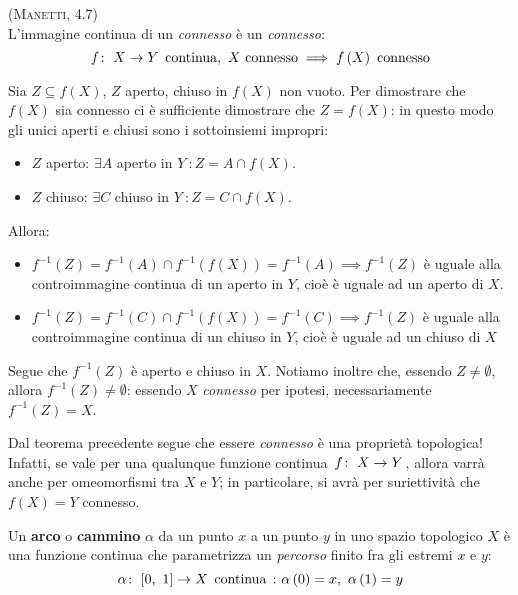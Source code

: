 \begin{theorema}\textsc{(Manetti, 4.7)}\\
	L'immagine continua di un \textit{connesso} è un \textit{connesso}:
	\begin{equation}
		\funz{f}{X}{Y}\text{ continua},\ X\text{ connesso}\implies f\left(X\right)\text{ connesso}
	\end{equation}
\end{theorema}
\begin{theorema}
	Sia $Z\subseteq f\left(X\right)$, $Z$ aperto, chiuso in $f\left(X\right)$ non vuoto. Per dimostrare che $f\left(X\right)$ sia connesso ci è sufficiente dimostrare che $Z=f\left(X\right)$: in questo modo gli unici aperti e chiusi sono i sottoinsiemi impropri:
	\begin{itemize}
		\item $Z$ aperto: $\exists A$ aperto in $Y\ \colon Z=A\cap f\left(X\right)$.
		\item $Z$ chiuso: $\exists C$ chiuso in $Y\ \colon Z=C\cap f\left(X\right)$.
	\end{itemize}
Allora:
	\begin{itemize}
	\item $f^{-1}\left(Z\right)=f^{-1}\left(A\right)\cap f^{-1}\left(f\left(X\right)\right)=f^{-1}\left(A\right)\implies f^{-1}\left(Z\right)$ è uguale alla controimmagine continua di un aperto in $Y$, cioè è uguale ad un aperto di $X$.
	\item $f^{-1}\left(Z\right)=f^{-1}\left(C\right)\cap f^{-1}\left(f\left(X\right)\right)=f^{-1}\left(C\right)\implies f^{-1}\left(Z\right)$ è uguale alla controimmagine continua di un chiuso in $Y$, cioè è uguale ad un chiuso di $X$
	\end{itemize}
Segue che $f^{-1}\left(Z\right)$ è aperto e chiuso in $X$. Notiamo inoltre che, essendo $Z\neq \emptyset$, allora $f^{-1}\left(Z\right)\neq \emptyset$: essendo $X$ \textit{connesso} per ipotesi, necessariamente $f^{-1}\left(Z\right)=X$.
\end{theorema}
\begin{observe}
Dal teorema precedente segue che essere \textit{connesso} è una proprietà topologica! Infatti, se vale per una qualunque funzione continua $\funz{f}{X}{Y}$, allora varrà anche per omeomorfismi tra $X$ e $Y$; in particolare, si avrà per suriettività che $f\left(X\right)=Y$ connesso.
\end{observe}
\begin{define}
Un \textbf{arco} o \textbf{cammino} $\alpha$ da un punto $x$ a un punto $y$ in uno spazio topologico $X$ è una funzione continua che parametrizza un \textit{percorso} finito fra gli estremi $x$ e $y$:
\begin{equation}
\funz{\alpha}{\left[0,\ 1\right]}{X} \text{ continua}\ \colon \alpha\left(0\right)=x,\ \alpha\left(1\right)=y
\end{equation}
\end{define}
